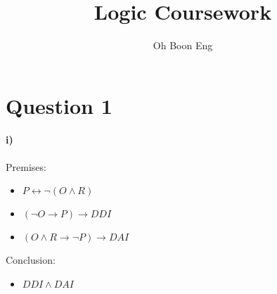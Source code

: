 \documentclass[12pt, a4paper]{article}
\title{Logic Coursework}
\author{Oh Boon Eng}
\begin{document}
\maketitle

\newpage
\section*{Question 1}
\noindent \textbf{i)}\\\\
\textnormal{Premises:}
\begin{itemize}
\item $P \longleftrightarrow \neg (O \wedge R)$
\item $(\neg O \longrightarrow P) \longrightarrow DDI$
\item $(O \wedge R \longrightarrow \neg P) \longrightarrow DAI$
\end{itemize}

\noindent\textnormal{Conclusion:}
\begin{itemize}
\item $DDI \wedge DAI$\\
\end{itemize}
\end{document}
